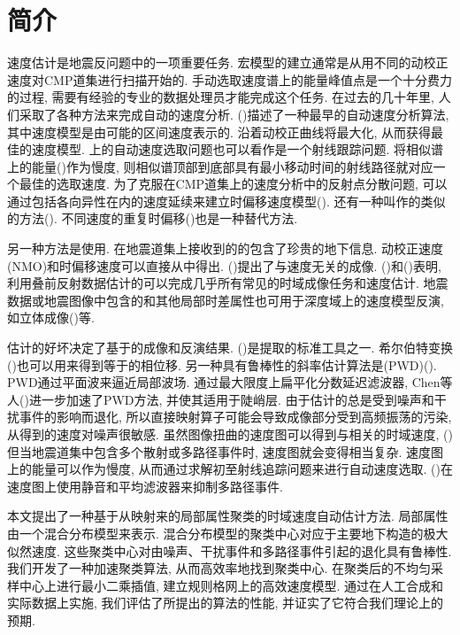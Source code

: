 \section{简介}
速度估计是地震反问题中的一项重要任务. 宏模型的建立通常是从用不同的动校正速度对CMP道集进行扫描开始的. 手动选取速度谱上的能量峰值点是一个十分费力的过程, 需要有经验的专业的数据处理员才能完成这个任务. 在过去的几十年里, 人们采取了各种方法来完成自动的速度分析. (\cite{Toldi1989})描述了一种最早的自动速度分析算法, 其中速度模型是由可能的区间速度表示的. 沿着动校正曲线将最大化, 从而获得最佳的速度模型. 上的自动速度选取问题也可以看作是一个射线跟踪问题. 将相似谱上的能量(\cite{Fomel2009})作为慢度, 则相似谱顶部到底部具有最小移动时间的射线路径就对应一个最佳的选取速度. 为了克服在CMP道集上的速度分析中的反射点分散问题, 可以通过包括各向异性在内的速度延续来建立时偏移速度模型(\cite{Adler2002,Fomel2003,Alkhalifah2011,Burnett2011}). 还有一种叫作的类似的方法(\cite{Schleicher2008}). 不同速度的重复时偏移(\cite{Yilmaz2001a})也是一种替代方法. 

另一种方法是使用. 在地震道集上接收到的的包含了珍贵的地下信息. 动校正速度(NMO)和时偏移速度可以直接从中得出. (\cite{Ottolini1983})提出了与速度无关的成像. (\cite{Fomel2007})和(\cite{Cooke2009})表明, 利用叠前反射数据估计的可以完成几乎所有常见的时域成像任务和速度估计. 地震数据或地震图像中包含的和其他局部时差属性也可用于深度域上的速度模型反演, 如立体成像(\cite{Billette1998,Lambare2008})等. 

估计的好坏决定了基于的成像和反演结果. (\cite{Ottolini1983})是提取的标准工具之一. 希尔伯特变换(\cite{Barnes1996,Cooke2009,Zhang2013,Wang2015})也可以用来得到等于的相位移. 另一种具有鲁棒性的斜率估计算法是(PWD)(\cite{Fomel2002, Schleicher2009}). PWD通过平面波来逼近局部波场. 通过最大限度上扁平化分数延迟滤波器, Chen等人(\cite{Chen2013,Chen2013a})进一步加速了PWD方法, 并使其适用于陡峭层. 由于估计的总是受到噪声和干扰事件的影响而退化, 所以直接映射算子可能会导致成像部分受到高频振荡的污染, 从得到的速度对噪声很敏感. 虽然图像扭曲的速度图可以得到与相关的时域速度, (\cite{Fomel2007})但当地震道集中包含多个散射或多路径事件时, 速度图就会变得相当复杂. 速度图上的能量可以作为慢度, 从而通过求解初至射线追踪问题来进行自动速度选取. (\cite{Cooke2009})在速度图上使用静音和平均滤波器来抑制多路径事件. 

本文提出了一种基于从映射来的局部属性聚类的时域速度自动估计方法. 局部属性由一个混合分布模型来表示. 混合分布模型的聚类中心对应于主要地下构造的极大似然速度. 这些聚类中心对由噪声、干扰事件和多路径事件引起的退化具有鲁棒性. 我们开发了一种加速聚类算法, 从而高效率地找到聚类中心. 在聚类后的不均匀采样中心上进行最小二乘插值, 建立规则格网上的高效速度模型. 通过在人工合成和实际数据上实施, 我们评估了所提出的算法的性能, 并证实了它符合我们理论上的预期. 
